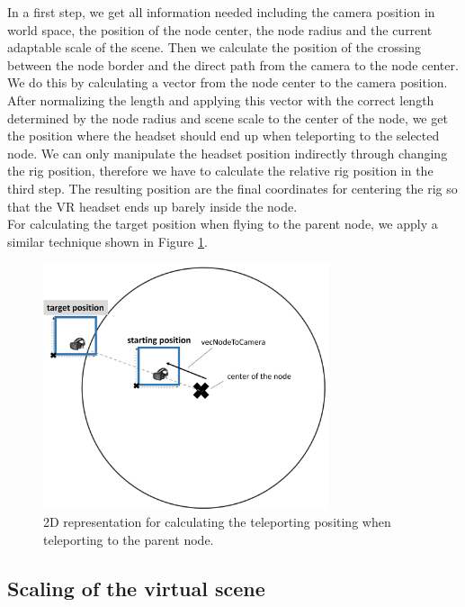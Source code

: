 In a first step, we get all information needed including the camera position in world space, the position of the node center, the node radius and the current adaptable scale of the scene.
Then we calculate the position of the crossing between the node border and the direct path from the camera to the node center. We do this by calculating a vector from the node center to the camera position. After normalizing the length and applying this vector with the correct length determined by the node radius and scene scale to the center of the node, we get the position where the headset should end up when teleporting to the selected node.
We can only manipulate the headset position indirectly through changing the rig position, therefore we have to calculate the relative rig position in the third step. 
The resulting position are the final coordinates for centering the rig so that the VR headset ends up barely inside the node.\\
For calculating the target position when flying to the parent node, we apply a similar technique shown in Figure \ref{fig:vrFlyToParentNode}.

\begin{figure}[h]
    \centering
    \includegraphics[width=0.75\textwidth]{graphics/flyToParentNode.jpg}
    \caption{2D representation for calculating the teleporting positing when teleporting to the parent node.} 
    \label{fig:vrFlyToParentNode} 
\end{figure}

\subsection{Scaling of the virtual scene}
\label{sec:scaling}

